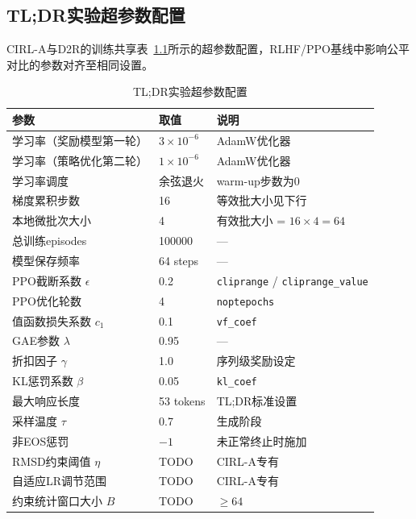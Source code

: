 
\begin{thesisappendix}

\chapter{TL;DR实验超参数配置}
\label{sec:hyperparams_appendix}

CIRL-A与D2R的训练共享表~\ref{tab:hyperparams_tldr}所示的超参数配置，RLHF/PPO基线中影响公平对比的参数对齐至相同设置。

\begin{table}[htbp]
    \centering
    \caption{TL;DR实验超参数配置}
    \label{tab:hyperparams_tldr}
    \small
    \renewcommand{\arraystretch}{1.2}
    \begin{tabular}{lll}
        \toprule
        \textbf{参数} & \textbf{取值} & \textbf{说明} \\
        \midrule
        学习率（奖励模型第一轮） & $3 \times 10^{-6}$ & AdamW优化器 \\
        学习率（策略优化第二轮） & $1 \times 10^{-6}$ & AdamW优化器 \\
        学习率调度 & 余弦退火 & warm-up步数为0 \\
        梯度累积步数 & 16 & 等效批大小见下行 \\
        本地微批次大小 & 4 & 有效批大小 = $16 \times 4 = 64$ \\
        总训练episodes & 100000 & — \\
        模型保存频率 & 64 steps & — \\
        PPO截断系数 $\epsilon$ & 0.2 & \texttt{cliprange} / \texttt{cliprange\_value} \\
        PPO优化轮数 & 4 & \texttt{noptepochs} \\
        值函数损失系数 $c_1$ & 0.1 & \texttt{vf\_coef} \\
        GAE参数 $\lambda$ & 0.95 & — \\
        折扣因子 $\gamma$ & 1.0 & 序列级奖励设定 \\
        KL惩罚系数 $\beta$ & 0.05 & \texttt{kl\_coef} \\
        最大响应长度 & 53 tokens & TL;DR标准设置 \\
        采样温度 $\tau$ & 0.7 & 生成阶段 \\
        非EOS惩罚 & $-1$ & 未正常终止时施加 \\
        \midrule
        RMSD约束阈值 $\eta$ & TODO & CIRL-A专有 \\
        自适应LR调节范围 & TODO & CIRL-A专有 \\
        约束统计窗口大小 $B$ & TODO & $\geq 64$ \\
        \bottomrule
    \end{tabular}
\end{table}

\end{thesisappendix}
